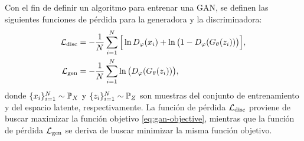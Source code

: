 {{Con el fin de definir un algoritmo para entrenar una GAN, se definen las siguientes funciones de pérdida para la generadora y la discriminadora:
\begin{align}
    \cL_{\mathrm{disc}} & = -\frac{1}{N}\sum_{i=1}^{N} \Big[ \ln D_\varphi(x_i) + \ln \qty\big(1 - D_\varphi(G_\theta(z_i))) \Big], \\
    \cL_{\mathrm{gen}}  & = - \frac{1}{N}\sum_{i=1}^{N} \ln \qty\big(D_\varphi(G_\theta(z_i))),
\end{align}
donde $\{x_i\}_{i=1}^{N} \sim \Prob_X$ y $\{z_i\}_{i=1}^{N} \sim \Prob_Z$ son muestras del conjunto de entrenamiento y del espacio latente, respectivamente. La función de pérdida $\mathcal{L}_{\mathrm{disc}}$ proviene de buscar maximizar la función objetivo \eqref{eq:gan-objective}, mientras que la función de pérdida $\mathcal{L}_{\mathrm{gen}}$ se deriva de buscar minimizar la misma función objetivo.

}}
